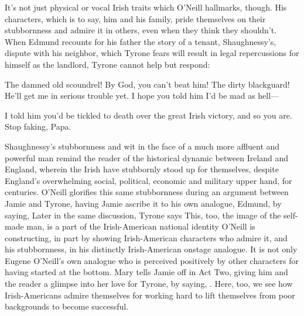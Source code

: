 \documentclass[letterpaper, 12pt]{article}
\newcommand{\oneill}{O'Neill}
\begin{document}
It's not just physical or vocal Irish traits which \oneill{} hallmarks,
though. His characters, which is to say, him and his family, pride themselves
on their stubbornness and admire it in others, even when they think they
shouldn't. When Edmund recounts for his father the story of a tenant,
Shaughnessy's, dispute with his neighbor, which Tyrone fears will result in
legal repercussions for himself as the landlord, Tyrone cannot help but
respond:

\begin{dialogue}
    The damned old
  scoundrel! By God, you can't beat him!  The dirty blackguard! He'll get me in serious trouble
  yet. I hope you told him I'd be mad as hell---

   I told him you'd be tickled to death over the great Irish
  victory, and so you are. Stop faking, Papa.

\end{dialogue}

Shaughnessy's stubbornness and wit in the face of a much more affluent and
powerful man remind the reader of the historical dynamic between Ireland and
England, wherein the Irish have stubbornly stood up for themselves, despite
England's overwhelming social, political, economic and military upper hand, for
centuries. \oneill{} glorifies this same stubbornness during an argument
between Jamie and Tyrone, having Jamie ascribe it to his own analogue, Edmund,
by saying,  Later in the same discussion, Tyrone says  This, too, the image of the self-made man, is a part of the
Irish-American national identity \oneill{} is constructing, in part by showing
Irish-American characters who admire it, and his stubbornness, in his
distinctly Irish-American onstage analogue. It is not only Eugene \oneill{}'s
own analogue who is perceived positively by other characters for having started
at the bottom. Mary tells Jamie off in Act Two, giving him and the reader a
glimpse into her love for Tyrone, by saying,
. Here, too, we
see how Irish-Americans admire themselves for working hard to lift themselves
from poor backgrounds to become successful.
\end{document}
